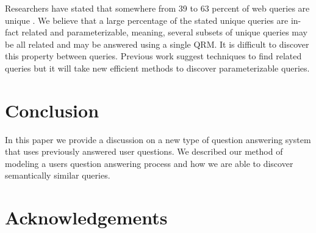 Researchers have stated that somewhere from 39 to 63 percent of web
queries are unique \cite{1277770,331405,621942}.  We believe that a
large percentage of the stated unique queries are in-fact related and
parameterizable, meaning, several subsets of unique queries may be all
related and may be answered using a single QRM.  It is difficult to
discover this property between queries.  Previous work suggest
techniques to find related queries but it will take new efficient
methods to discover parameterizable queries.


\section{Conclusion}

In this paper we provide a discussion on a new type of question
answering system that uses previously answered user questions.  We
described our method of modeling a users question answering process
and how we are able to discover semantically similar queries.


\section{Acknowledgements}
